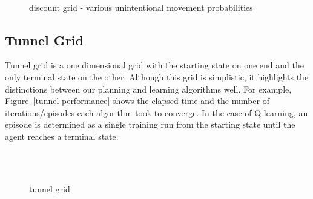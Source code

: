 \documentclass{sig-alternate}
\begin{document}
\begin{figure}[!htbp]
    \centering
    ~
    \\
    \caption{discount grid - various unintentional movement probabilities}
\end{figure} 

\subsection{Tunnel Grid}

Tunnel grid is a one dimensional grid with the starting state on one end and the only terminal state on the other. Although this grid is simplistic, it highlights the distinctions between our planning and learning algorithms well. For example, Figure~\ref{tunnel-performance} shows the elapsed time and the number of iterations/episodes each algorithm took to converge. In the case of Q-learning, an episode is determined as a single training run from the starting state until the agent reaches a terminal state.

\begin{figure}[!htbp]
    \centering
    \\
    \\
    \caption{tunnel grid}
\end{figure} 
\end{document}
